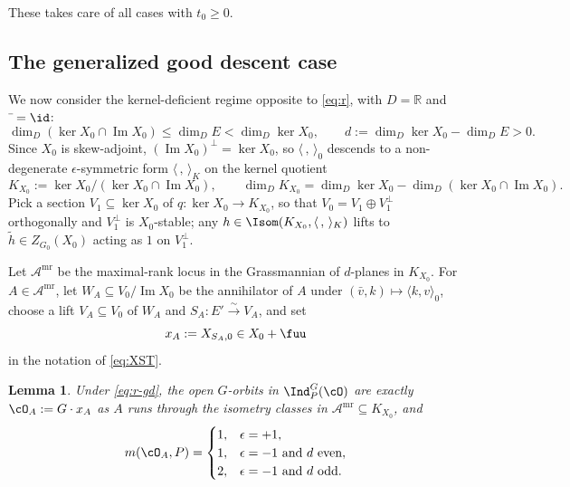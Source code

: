 \documentclass[11pt,a4paper]{amsart}
\def\Im{\operatorname{Im}}
\newcommand{\BR}{{\mathbb {R}}}
\numberwithin{equation}{section}
\newtheorem{lem}[thm]{Lemma}
\theoremstyle{remark}
\def\subset{\subseteq}
\begin{document}
These takes care of all cases with $t_0 \geq 0$. 

\subsection{The generalized good descent case}\label{sec:app-gd}

We now consider the kernel-deficient regime opposite to \eqref{eq:r}, with $D=\BR$ and $\bar{\ }=\id$:
\begin{equation}\label{eq:r-gd}
\dim_D(\ker X_0\cap \Im X_0)\le \dim_D E<\dim_D\ker X_0,
\qquad
d:=\dim_D\ker X_0-\dim_D E>0.
\end{equation}
Since $X_0$ is skew-adjoint, $(\Im X_0)^\perp=\ker X_0$, so $\langle\,,\,\rangle_0$ descends to a non-degenerate $\epsilon$-symmetric form $\langle\,,\,\rangle_K$ on the kernel quotient
\[
K_{X_0}:=\ker X_0/(\ker X_0\cap \Im X_0),\qquad \dim_D K_{X_0}=\dim_D\ker X_0-\dim_D(\ker X_0\cap \Im X_0).
\]
Pick a section $V_1\subset \ker X_0$ of $q:\ker X_0\to K_{X_0}$, so that $V_0=V_1\oplus V_1^\perp$ orthogonally and $V_1^\perp$ is $X_0$-stable; any $h\in\Isom(K_{X_0},\langle\,,\,\rangle_K)$ lifts to $\tilde h\in Z_{G_0}(X_0)$ acting as $1$ on $V_1^\perp$.

Let $\mathscr A^{\mathrm{mr}}$ be the maximal-rank locus in the Grassmannian of $d$-planes in $K_{X_0}$. For $A\in \mathscr A^{\mathrm{mr}}$, let $W_A\subset V_0/\Im X_0$ be the annihilator of $A$ under $(\bar v,k)\mapsto \langle k,v\rangle_0$, choose a lift $V_A\subset V_0$ of $W_A$ and $S_A:E'\xrightarrow{\sim}V_A$, and set
\begin{equation}\label{eq:gd-xA}
x_A:=X_{S_A,0}\in X_0+\fuu
\end{equation}
in the notation of \eqref{eq:XST}.

\begin{lem}\label{lem:app-gd}
Under \eqref{eq:r-gd}, the open $G$-orbits in $\Ind_P^G(\cO)$ are exactly $\cO_A:=G\cdot x_A$ as $A$ runs through the isometry classes in $\mathscr A^{\mathrm{mr}}\subset K_{X_0}$, and
\[
m(\cO_A,P)=
\begin{cases}
1,&\epsilon=+1,\\
1,&\epsilon=-1\ \text{and}\ d\text{ even},\\
2,&\epsilon=-1\ \text{and}\ d\text{ odd}.
\end{cases}
\]
\end{lem}
\end{document}

